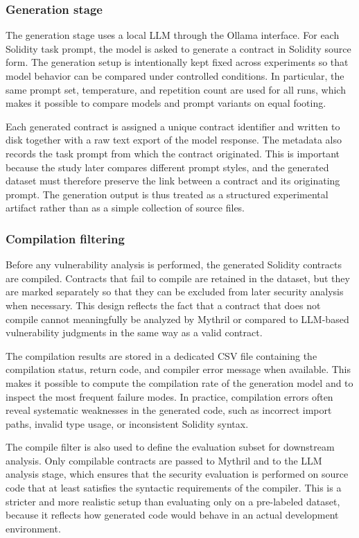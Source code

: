\documentclass[a4paper,11pt]{article}\usepackage{graphicx} %
\begin{document}
\subsubsection{Generation stage}

The generation stage uses a local LLM through the Ollama interface. For each Solidity task prompt, the model is asked to generate a contract in Solidity source form. The generation setup is intentionally kept fixed across experiments so that model behavior can be compared under controlled conditions. In particular, the same prompt set, temperature, and repetition count are used for all runs, which makes it possible to compare models and prompt variants on equal footing.

Each generated contract is assigned a unique contract identifier and written to disk together with a raw text export of the model response. The metadata also records the task prompt from which the contract originated. This is important because the study later compares different prompt styles, and the generated dataset must therefore preserve the link between a contract and its originating prompt. The generation output is thus treated as a structured experimental artifact rather than as a simple collection of source files.

\subsubsection{Compilation filtering}

Before any vulnerability analysis is performed, the generated Solidity contracts are compiled. Contracts that fail to compile are retained in the dataset, but they are marked separately so that they can be excluded from later security analysis when necessary. This design reflects the fact that a contract that does not compile cannot meaningfully be analyzed by Mythril or compared to LLM-based vulnerability judgments in the same way as a valid contract.

The compilation results are stored in a dedicated CSV file containing the compilation status, return code, and compiler error message when available. This makes it possible to compute the compilation rate of the generation model and to inspect the most frequent failure modes. In practice, compilation errors often reveal systematic weaknesses in the generated code, such as incorrect import paths, invalid type usage, or inconsistent Solidity syntax.

The compile filter is also used to define the evaluation subset for downstream analysis. Only compilable contracts are passed to Mythril and to the LLM analysis stage, which ensures that the security evaluation is performed on source code that at least satisfies the syntactic requirements of the compiler. This is a stricter and more realistic setup than evaluating only on a pre-labeled dataset, because it reflects how generated code would behave in an actual development environment.
\end{document}
